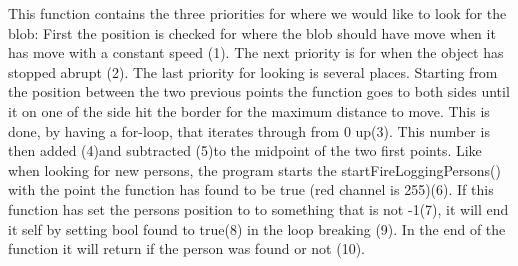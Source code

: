 This function contains the three priorities for where we would like to look for the blob: First the position is checked for where the blob should have move when it has move with a constant speed (1). The next priority is for when the object has stopped abrupt (2). The last priority for looking is several places. Starting from the position between the two previous points the function goes to both sides until it on one of the side hit the border for the maximum distance to move. This is done, by having a for-loop, that iterates through from 0 up(3). This number is then added (4)and subtracted (5)to the midpoint of the two first points. Like when looking for new persons, the program starts the startFireLoggingPersons() with the point the function has found to be true (red channel is 255)(6). If this function has set the persons position to to something that is not -1(7), it will end it self by setting bool found to true(8) in the loop breaking (9). In the end of the function it will return if the person was found or not (10).
	
